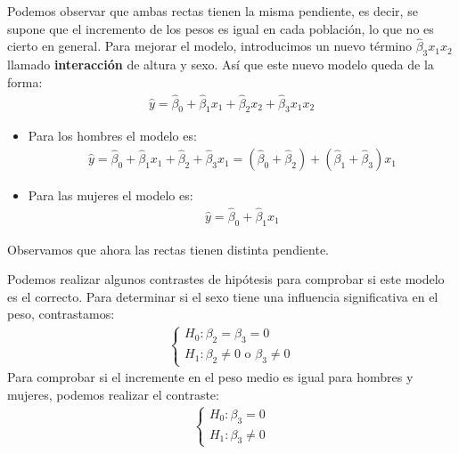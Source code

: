 \begin{ejemplo}
    Podemos observar que ambas rectas tienen la misma pendiente, es decir, se supone que el incremento de los pesos es igual en cada población, lo que no es cierto en general.  Para mejorar el modelo, introducimos un nuevo término $\widehat{\beta}_3x_1x_2$ llamado \textbf{interacción} de altura y sexo. Así que este nuevo modelo queda de la forma:
    \begin{align*}
        \widehat{y} = \widehat{\beta}_0 + \widehat{\beta}_1x_1 + \widehat{\beta}_2x_2 + \widehat{\beta}_3x_1x_2
    \end{align*}
    \begin{itemize}
        \item Para los hombres el modelo es:
              \begin{align*}
                  \widehat{y} = \widehat{\beta}_0 + \widehat{\beta}_1x_1 + \widehat{\beta}_2 + \widehat{\beta}_3x_1 = (\widehat{\beta}_0 + \widehat{\beta}_2) + (\widehat{\beta}_1 + \widehat{\beta}_3)x_1
              \end{align*}
        \item Para las mujeres el modelo es:
              \begin{align*}
                  \widehat{y} = \widehat{\beta}_0 + \widehat{\beta}_1x_1
              \end{align*}
    \end{itemize}
    Observamos que ahora las rectas tienen distinta pendiente.

    Podemos realizar algunos contrastes de hipótesis para comprobar si este modelo es el correcto. Para determinar si el sexo tiene una influencia significativa en el peso, contrastamos:
    \begin{align*}
        \begin{cases}
            H_0: \beta_2 = \beta_3 = 0 \\
            H_1: \beta_2 \neq 0 \text{ o } \beta_3 \neq 0
        \end{cases}
    \end{align*}
    Para comprobar si el incremente en el peso medio es igual para hombres y mujeres, podemos realizar el contraste:
    \begin{align*}
        \begin{cases}
            H_0: \beta_3 = 0 \\
            H_1: \beta_3 \neq 0
        \end{cases}
    \end{align*}
\end{ejemplo}


